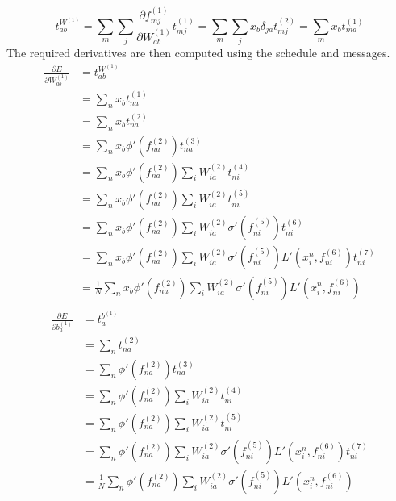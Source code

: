 \documentclass[fleqn]{article}
\begin{document}
\begin{equation}
    t^{W^{(1)}}_{ab} = \sum_m \sum_j \frac{\partial f^{(1)}_{mj}}{\partial W^{(1)}_{ab}} t^{(1)}_{mj} = \sum_m \sum_j x_b \delta_{ja} t^{(2)}_{mj} =
    \sum_m x_b t^{(1)}_{ma}
\end{equation}
The required derivatives are then computed using the schedule and messages.
\begin{equation}
    \begin{split}
        \frac{\partial E}{\partial W^{(1)}_{ab}} & = t^{W^{(1)}}_{ab} \\
        & = \sum_n x_b t^{(1)}_{na} \\
        & = \sum_n x_b t^{(2)}_{na} \\
        & = \sum_n x_b \phi ' \left (f^{(2)}_{na}\right) t^{(3)}_{na} \\
        & = \sum_n x_b \phi ' \left (f^{(2)}_{na}\right) \sum_i W^{(2)}_{ia} t^{(4)}_{ni} \\
        & = \sum_n x_b \phi ' \left (f^{(2)}_{na}\right) \sum_i W^{(2)}_{ia} t^{(5)}_{ni} \\
        & = \sum_n x_b \phi ' \left (f^{(2)}_{na}\right) \sum_i W^{(2)}_{ia} \sigma'\left(f^{(5)}_{ni}\right) t^{(6)}_{ni} \\
        & = \sum_n x_b \phi ' \left (f^{(2)}_{na}\right) \sum_i W^{(2)}_{ia} \sigma'\left(f^{(5)}_{ni}\right) L'\left(x^n_i, f^{(6)}_{ni}\right) t^{(7)}_{ni} \\
        & = \frac{1}{N} \sum_n x_b \phi ' \left (f^{(2)}_{na}\right) \sum_i W^{(2)}_{ia} \sigma'\left(f^{(5)}_{ni}\right) L'\left(x^n_i, f^{(6)}_{ni}\right) \\
    \end{split}
\end{equation}
\begin{equation}
    \begin{split}
        \frac{\partial E}{\partial b^{(1)}_{a}} & = t^{b^{(1)}}_{a} \\
        & = \sum_n t^{(2)}_{na} \\
        & = \sum_n \phi ' \left (f^{(2)}_{na}\right) t^{(3)}_{na} \\
        & = \sum_n \phi ' \left (f^{(2)}_{na}\right) \sum_i W^{(2)}_{ia} t^{(4)}_{ni} \\
        & = \sum_n \phi ' \left (f^{(2)}_{na}\right) \sum_i W^{(2)}_{ia} t^{(5)}_{ni} \\
        & = \sum_n \phi ' \left (f^{(2)}_{na}\right) \sum_i W^{(2)}_{ia} \sigma'\left(f^{(5)}_{ni}\right) L'\left(x^n_i, f^{(6)}_{ni}\right) t^{(7)}_{ni} \\
        & = \frac{1}{N} \sum_n \phi ' \left (f^{(2)}_{na}\right) \sum_i W^{(2)}_{ia} \sigma'\left(f^{(5)}_{ni}\right) L'\left(x^n_i, f^{(6)}_{ni}\right) \\
    \end{split}
\end{equation}
\end{document}

